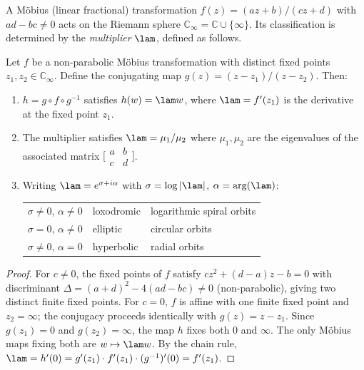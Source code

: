 A M\"obius (linear fractional) transformation
$f(z) = (az+b)/(cz+d)$ with $ad - bc \neq 0$ acts on the Riemann sphere
$\mathbb{C}_\infty = \mathbb{C} \cup \{\infty\}$.  Its classification is
determined by the \emph{multiplier} $\lam$, defined as follows.

\begin{theorem}\label{thm:conjugacy}
Let $f$ be a non-parabolic M\"obius transformation with distinct fixed
points $z_1, z_2 \in \mathbb{C}_\infty$.  Define the conjugating map
$g(z) = (z - z_1)/(z - z_2)$.  Then:
\begin{enumerate}
  \item $h = g \circ f \circ g^{-1}$ satisfies $h(w) = \lam w$, where
    $\lam = f'(z_1)$ is the derivative at the fixed point $z_1$.
  \item The multiplier satisfies $\lam = \mu_1/\mu_2$ where $\mu_1, \mu_2$
    are the eigenvalues of the associated matrix
    $\bigl[\begin{smallmatrix}a&b\\c&d\end{smallmatrix}\bigr]$.
  \item Writing $\lam = e^{\sigma + i\alpha}$ with
    $\sigma = \log|\lam|$, $\alpha = \arg(\lam)$:
    \begin{center}
    \begin{tabular}{lll}
    \toprule
    $\sigma \neq 0$, $\alpha \neq 0$ & loxodromic & logarithmic spiral orbits \\
    $\sigma = 0$, $\alpha \neq 0$    & elliptic   & circular orbits \\
    $\sigma \neq 0$, $\alpha = 0$    & hyperbolic & radial orbits \\
    \bottomrule
    \end{tabular}
    \end{center}
\end{enumerate}
\end{theorem}

\begin{proof}
For $c \neq 0$, the fixed points of $f$ satisfy $cz^2 + (d-a)z - b = 0$
with discriminant $\Delta = (a+d)^2 - 4(ad-bc) \neq 0$ (non-parabolic),
giving two distinct finite fixed points.  For $c = 0$, $f$ is affine with
one finite fixed point and $z_2 = \infty$; the conjugacy proceeds
identically with $g(z) = z - z_1$.
Since $g(z_1) = 0$ and $g(z_2) = \infty$, the map $h$ fixes both $0$ and
$\infty$.  The only M\"obius maps fixing both are $w \mapsto \lam w$.  By
the chain rule, $\lam = h'(0) = g'(z_1) \cdot f'(z_1) \cdot
(g^{-1})'(0) = f'(z_1)$.
\end{proof}

